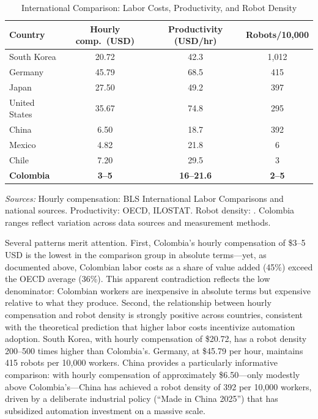\documentclass{article}
\begin{document}
\begin{table}[H]
\centering
\caption{International Comparison: Labor Costs, Productivity, and Robot Density}
\label{tab:international_comparison}
\begin{threeparttable}
\begin{tabular}{lccc}
\toprule
\textbf{Country} & \textbf{Hourly comp.\ (USD)} & \textbf{Productivity (USD/hr)} & \textbf{Robots/10,000} \\
\midrule
South Korea & 20.72 & 42.3 & 1,012 \\
Germany & 45.79 & 68.5 & 415 \\
Japan & 27.50 & 49.2 & 397 \\
United States & 35.67 & 74.8 & 295 \\
China & 6.50 & 18.7 & 392 \\
Mexico & 4.82 & 21.8 & 6 \\
Chile & 7.20 & 29.5 & 3 \\
\textbf{Colombia} & \textbf{3--5} & \textbf{16--21.6} & \textbf{2--5} \\
\bottomrule
\end{tabular}
\begin{tablenotes}
\small
\item \textit{Sources:} Hourly compensation: BLS International Labor Comparisons and national sources. Productivity: OECD, ILOSTAT. Robot density: \cite{ifr2024}. Colombia ranges reflect variation across data sources and measurement methods.
\end{tablenotes}
\end{threeparttable}
\end{table}

Several patterns merit attention. First, Colombia's hourly compensation of \$3--5 USD is the lowest in the comparison group in absolute terms---yet, as documented above, Colombian labor costs as a share of value added (45\%) exceed the OECD average (36\%). This apparent contradiction reflects the low denominator: Colombian workers are inexpensive in absolute terms but expensive relative to what they produce. Second, the relationship between hourly compensation and robot density is strongly positive across countries, consistent with the theoretical prediction that higher labor costs incentivize automation adoption. South Korea, with hourly compensation of \$20.72, has a robot density 200--500 times higher than Colombia's. Germany, at \$45.79 per hour, maintains 415 robots per 10,000 workers. China provides a particularly informative comparison: with hourly compensation of approximately \$6.50---only modestly above Colombia's---China has achieved a robot density of 392 per 10,000 workers, driven by a deliberate industrial policy (``Made in China 2025'') that has subsidized automation investment on a massive scale.
\end{document}
